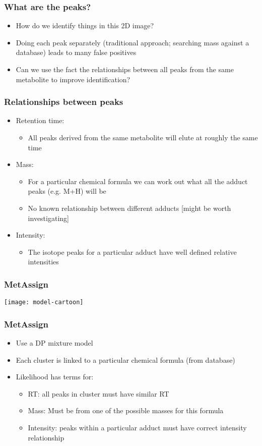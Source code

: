 \begin{frame}
	\frametitle{What are the peaks?}
	\begin{itemize}
		\item How do we identify things in this 2D image?
		\item Doing each peak separately (traditional approach; searching mass against a database) leads to many false positives
		\item Can we use the fact the relationships between all peaks from the same metabolite to improve identification?
	\end{itemize}
\end{frame}

\begin{frame}
	\frametitle{Relationships between peaks}
		\begin{itemize}
			\item Retention time:
			\begin{itemize}
				\item All peaks derived from the same metabolite will elute at roughly the same time
			\end{itemize}
			\item<2-> Mass:
			\begin{itemize}
				\item For a particular chemical formula we can work out what all the adduct peaks (e.g. M+H) will be
				\item No known relationship between different adducts [might be worth investigating]
			\end{itemize}
			\item<3-> Intensity:
			\begin{itemize}
				\item The isotope peaks for a particular adduct have well defined relative intensities
			\end{itemize}
		\end{itemize}
\end{frame}

\begin{frame}
	\frametitle{MetAssign}
	\centering\texttt{[image: model-cartoon]}
\end{frame}

\begin{frame}
	\frametitle{MetAssign}
	\begin{itemize}
		\item Use a DP mixture model
		\item Each cluster is linked to a particular chemical formula (from database)
		\item Likelihood has terms for:
		\begin{itemize}
			\item RT: all peaks in cluster must have similar RT
			\item Mass: Must be from one of the possible masses for this formula
			\item Intensity: peaks within a particular adduct must have correct intensity relationship
		\end{itemize}
	\end{itemize}
\end{frame}

